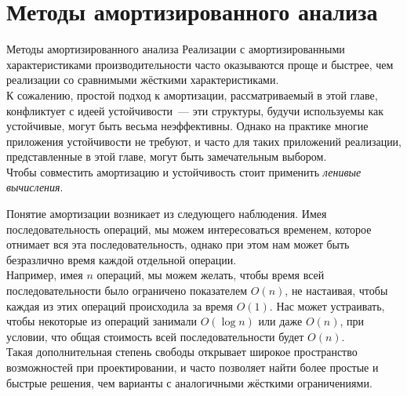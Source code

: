 




\section{Методы амортизированного анализа}
\label{sc:5.1}


\begin{frame}{Методы амортизированного анализа}
Реализации с амортизированными
характеристиками производительности часто оказываются проще и быстрее,
чем реализации со сравнимыми жёсткими характеристиками. \\

К сожалению, простой подход к амортизации, рассматриваемый в этой
главе, конфликтует с идеей устойчивости~--- эти структуры, будучи
используемы как устойчивые, могут быть весьма неэффективны. Однако на
практике многие приложения устойчивости не требуют, и часто для таких
приложений реализации, представленные в этой главе, могут быть
замечательным выбором. \\

Чтобы совместить амортизацию и устойчивость стоит применить 
\emph{ленивые вычисления}.

%
\end{frame}


\begin{frame}[fragile]{}
Понятие амортизации возникает из следующего наблюдения.  Имея
последовательность операций, мы можем интересоваться временем, которое
отнимает вся эта последовательность, однако при этом нам может быть
безразлично время каждой отдельной операции.\\

 Например, имея $n$
операций, мы можем желать, чтобы время всей последовательности было
ограничено показателем $O(n)$, не настаивая, чтобы каждая из этих
операций происходила за время $O(1)$. Нас может устраивать, чтобы
некоторые из операций занимали $O(\log n)$ или даже $O(n)$, при
условии, что общая стоимость всей последовательности будет
$O(n)$. \\

Такая дополнительная степень свободы открывает широкое
пространство возможностей при проектировании, и часто позволяет найти
более простые и быстрые решения, чем варианты с аналогичными жёсткими
ограничениями.

\end{frame}


